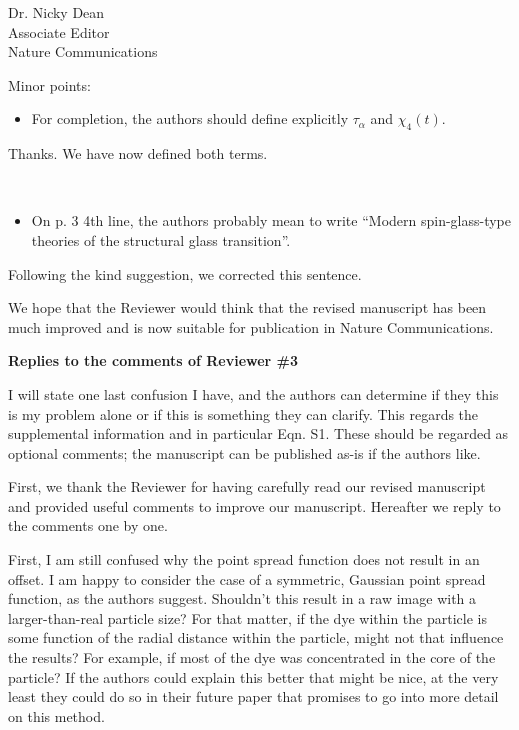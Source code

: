 \documentclass[a4paper, rebuttal, parskip=true, firsthead=false, fromemail=true, foldmarks=false]{scrlttr2}
\begin{document}
\begin{letter}{Dr. Nicky Dean\\
Associate Editor\\
Nature Communications}
\begin{quotationi}
Minor points:
\begin{itemize}
\item For completion, the authors should define explicitly $\tau_\alpha$ and $\chi_4(t)$.
\end{itemize}
\end{quotationi}
Thanks. We have now defined both terms.

\begin{quotationi}
~
\begin{itemize}
\item On p. 3 4th line, the authors probably mean to write ``Modern spin-glass-type theories of the structural glass transition''.
\end{itemize}
\end{quotationi}
Following the kind suggestion, we corrected this sentence.

We hope that the Reviewer would think that the revised manuscript has been much improved and is now suitable for publication in Nature Communications. 
 
\clearpage

\textsf{\textbf{Replies to the comments of Reviewer \#3}}

\begin{quotationi}
I will state one last confusion I have, and the authors can determine if they this is my problem alone or if this is something they can clarify. This regards the supplemental information and in particular Eqn. S1. These should be regarded as optional comments; the manuscript can be published as-is if the authors like.
\end{quotationi}

First, we thank the Reviewer for having carefully read our revised manuscript and provided useful comments to improve our manuscript. Hereafter we reply to the comments one by one.

\begin{quotationi}
First, I am still confused why the point spread function does not result in an offset. I am happy to consider the case of a symmetric, Gaussian point spread function, as the authors suggest. Shouldn't this result in a raw image with a larger-than-real particle size? For that matter, if the dye within the particle is some function of the radial distance within the particle, might not that influence the results? For example, if most of the dye was concentrated in the core of the particle? If the authors could explain this better that might be nice, at the very least they could do so in their future paper that promises to go into more detail on this method.
\end{quotationi}


\end{letter}
\end{document}
